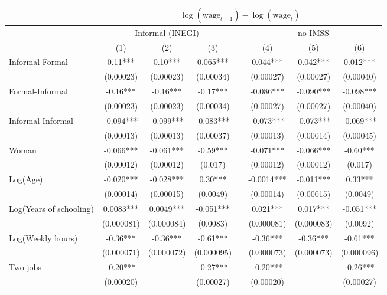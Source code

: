 \begin{tabular}{lccccccc}
\toprule
      & \multicolumn{7}{c}{$\log(\text{wage}_{t+1})-\log(\text{wage}_{t})$} \\
\midrule
      & \multicolumn{3}{c}{Informal (INEGI)} &       & \multicolumn{3}{c}{no IMSS} \\
\cmidrule{2-4}\cmidrule{6-8}      & (1)   & (2)   & (3)   &       & (4)   & (5)   & (6) \\
\midrule
\midrule
Informal-Formal  & 0.11*** & 0.10*** & 0.065*** &       & 0.044*** & 0.042*** & 0.012*** \\
      & (0.00023) & (0.00023) & (0.00034) &       & (0.00027) & (0.00027) & (0.00040) \\
Formal-Informal & -0.16*** & -0.16*** & -0.17*** &       & -0.086*** & -0.090*** & -0.098*** \\
      & (0.00023) & (0.00023) & (0.00034) &       & (0.00027) & (0.00027) & (0.00040) \\
Informal-Informal & -0.094*** & -0.099*** & -0.083*** &       & -0.073*** & -0.073*** & -0.069*** \\
      & (0.00013) & (0.00013) & (0.00037) &       & (0.00013) & (0.00014) & (0.00045) \\
\midrule
Woman & -0.066*** & -0.061*** & -0.59*** &       & -0.071*** & -0.066*** & -0.60*** \\
      & (0.00012) & (0.00012) & (0.017) &       & (0.00012) & (0.00012) & (0.017) \\
Log(Age) & -0.020*** & -0.028*** & 0.30*** &       & -0.0014*** & -0.011*** & 0.33*** \\
      & (0.00014) & (0.00015) & (0.0049) &       & (0.00014) & (0.00015) & (0.0049) \\
Log(Years of schooling) & 0.0083*** & 0.0049*** & -0.051*** &       & 0.021*** & 0.017*** & -0.051*** \\
      & (0.000081) & (0.000084) & (0.0083) &       & (0.000081) & (0.000083) & (0.0092) \\
Log(Weekly hours) & -0.36*** & -0.36*** & -0.61*** &       & -0.36*** & -0.36*** & -0.61*** \\
      & (0.000071) & (0.000072) & (0.000095) &       & (0.000073) & (0.000073) & (0.000096) \\
Two jobs & -0.20*** &       & -0.27*** &       & -0.20*** &       & -0.26*** \\
      & (0.00020) &       & (0.00027) &       & (0.00020) &       & (0.00027) \\

\end{tabular}
